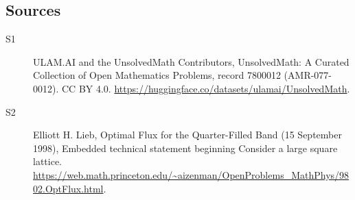 \documentclass[11pt]{article}
\begin{document}
\subsection{Sources}
\begin{description}
\item[\hypertarget{source:7800012:1}{S1}] ULAM.AI and the UnsolvedMath Contributors, UnsolvedMath: A Curated Collection of Open Mathematics Problems, record 7800012 (AMR-077-0012). CC BY 4.0. \url{https://huggingface.co/datasets/ulamai/UnsolvedMath}.
\item[\hypertarget{source:7800012:2}{S2}] Elliott H. Lieb, Optimal Flux for the Quarter-Filled Band (15 September 1998), Embedded technical statement beginning Consider a large square lattice. \url{https://web.math.princeton.edu/~aizenman/OpenProblems_MathPhys/9802.OptFlux.html}.
\end{description}
\label{end:7800012}
\end{document}
